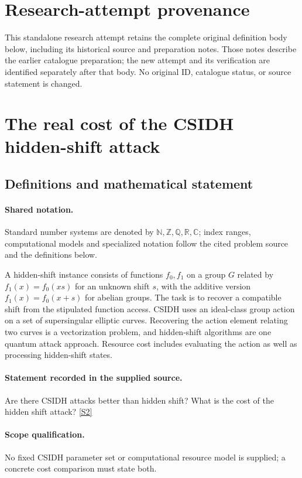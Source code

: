 \documentclass[11pt]{article}
\begin{document}
\section*{Research-attempt provenance}
This standalone research attempt retains the complete original definition body below,
including its historical source and preparation notes. Those notes describe the
earlier catalogue preparation; the new attempt and its verification are identified
separately after that body. No original ID, catalogue status, or source statement is changed.

\section{The real cost of the CSIDH hidden-shift attack}\label{statement}

\subsection{Definitions and mathematical statement}

\paragraph{Shared notation.}Standard number systems are denoted by $\mathbb N,\mathbb Z,\mathbb Q,\mathbb R,\mathbb C$; index ranges, computational models and specialized notation follow the cited problem source and the definitions below.


A hidden-shift instance consists of functions $f_0,f_1$ on a group $G$ related by $f_1(x)=f_0(xs)$ for an unknown shift $s$, with the additive version $f_1(x)=f_0(x+s)$ for abelian groups. The task is to recover a compatible shift from the stipulated function access. CSIDH uses an ideal-class group action on a set of supersingular elliptic curves. Recovering the action element relating two curves is a vectorization problem, and hidden-shift algorithms are one quantum attack approach. Resource cost includes evaluating the action as well as processing hidden-shift states.
\paragraph{Statement recorded in the supplied source.}
Are there CSIDH attacks better than hidden shift? What is the cost of the hidden shift attack? \href{http://aimpl.org/quantumalg/5/}{[S2]}
\paragraph{Scope qualification.}
No fixed CSIDH parameter set or computational resource model is supplied; a concrete cost comparison must state both.
\end{document}
